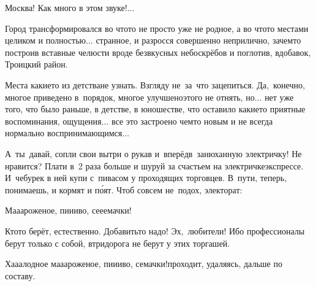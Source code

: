 %

\diagdash Москва! Как много в этом звуке!$\ldots$ 

Город трансформировался во что\sdash то не просто уже не родное, а во что\sdash то местами целиком и полностью$\ldots$ странное, и разросся совершенно неприлично, зачем\sdash то построив вставные челюсти вроде безвкусных небоскрёбов и поглотив, вдобавок, Троицкий район. 

Места какие\sdash то из детства\mdash не узнать. Взгляду не~за~что зацепиться. Да,~конечно, многое приведено в~порядок, многое улучшено\mdash этого не отнять, но$\ldots$ нет уже того, что было раньше, в детстве, в юношестве, что оставило какие\sdash то приятные воспоминания, ощущения$\ldots$ все это застроено чем\sdash то новым и не всегда нормально воспринимающимся$\ldots$

А~ты~давай, сопли свои вытри о рукав и~вперёд\mdash в~занюханную электричку! Не нравится? Плати в~2 раза больше и шуруй за счастьем на электричке\sdash экспрессе. И~чебурек в ней купи с~пивасом у проходящих торговцев. В~пути, теперь, понимаешь, и кормят и п\'{о}ят. Чтоб совсем не~подох, электорат:

\diagdash Ма\sdash а\sdash ароженое, пи\sdash и\sdash иво, се\sdash е\sdash емачки!

Кто\sdash то берёт, естественно. Добавить\sdash то надо! Эх,~любители! Ибо профессионалы берут только с собой, втридорога не берут у этих торгашей.

\diagdash Ха\sdash а\sdash алодное ма\sdash а\sdash ароженое, пи\sdash и\sdash иво, семачки!\mdash проходит, удаляясь, дальше по составу.

